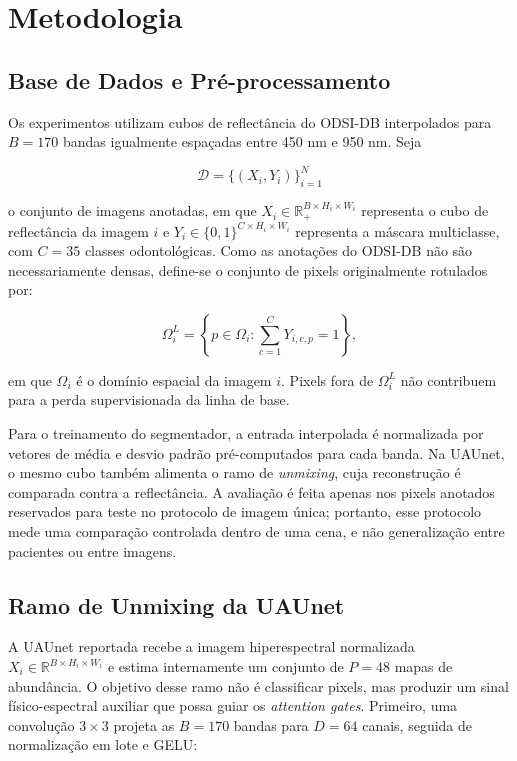 \documentclass[conference]{IEEEtran}
\begin{document}
\section{Metodologia}

\subsection{Base de Dados e Pré-processamento}

Os experimentos utilizam cubos de reflectância do ODSI-DB interpolados para
$B=170$ bandas igualmente espaçadas entre 450 nm e 950 nm. Seja

\[
\mathcal{D}=\{(X_i,Y_i)\}_{i=1}^{N}
\]

o conjunto de imagens anotadas, em que
$X_i\in\mathbb{R}_{+}^{B\times H_i\times W_i}$ representa o cubo de
reflectância da imagem $i$ e
$Y_i\in\{0,1\}^{C\times H_i\times W_i}$ representa a máscara multiclasse, com
$C=35$ classes odontológicas. Como as anotações do ODSI-DB não são
necessariamente densas, define-se o conjunto de pixels originalmente rotulados
por:

\[
\Omega_i^{L} =
\left\{p \in \Omega_i :
\sum_{c=1}^{C}Y_{i,c,p}=1
\right\},
\]

em que $\Omega_i$ é o domínio espacial da imagem $i$. Pixels fora de
$\Omega_i^{L}$ não contribuem para a perda supervisionada da linha de base.

Para o treinamento do segmentador, a entrada interpolada é normalizada por
vetores de média e desvio padrão pré-computados para cada banda. Na UAUnet, o
mesmo cubo também alimenta o ramo de \textit{unmixing}, cuja reconstrução é
comparada contra a reflectância. A avaliação é feita apenas nos pixels anotados
reservados para teste no protocolo de imagem única; portanto, esse protocolo
mede uma comparação controlada dentro de uma cena, e não generalização entre
pacientes ou entre imagens.

\subsection{Ramo de Unmixing da UAUnet}

A UAUnet reportada recebe a imagem hiperespectral normalizada
$X_i\in\mathbb{R}^{B\times H_i\times W_i}$ e estima internamente um conjunto de
$P=48$ mapas de abundância. O objetivo desse ramo não é classificar pixels, mas
produzir um sinal físico-espectral auxiliar que possa guiar os
\textit{attention gates}. Primeiro, uma convolução $3\times3$ projeta as
$B=170$ bandas para $D=64$ canais, seguida de normalização em lote e GELU:
\end{document}
